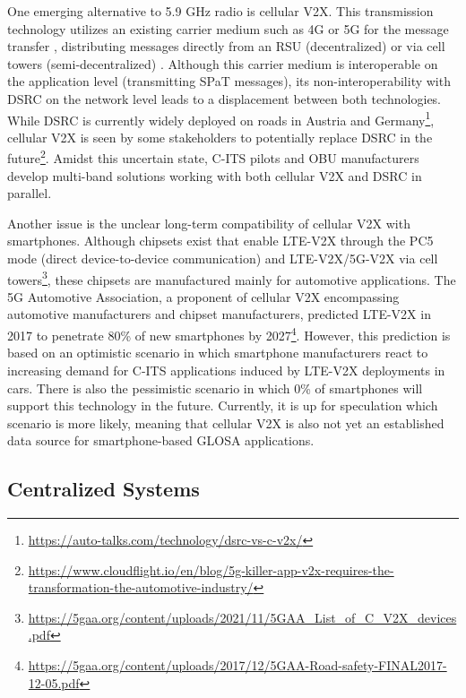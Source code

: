 One emerging alternative to 5.9 GHz radio is cellular V2X. This transmission technology utilizes an existing carrier medium such as 4G or 5G for the message transfer \cite{xia_field_2012, zweck_traffic_2013, bhattacharyya_assessing_2022}, distributing messages directly from an RSU (decentralized) \cite{bohm_radio_2017} or via cell towers (semi-decentralized) \cite{strobl_c-its_2019, jacob_ivs-kom_2020}. Although this carrier medium is interoperable on the application level (transmitting SPaT messages), its non-interoperability with DSRC \cite{bohm_radio_2017} on the network level leads to a displacement between both technologies. While DSRC is currently widely deployed on roads in Austria and Germany\footnote{\url{https://auto-talks.com/technology/dsrc-vs-c-v2x/}}, cellular V2X is seen by some stakeholders to potentially replace DSRC in the future\footnote{\label{cloudflight-article}\url{https://www.cloudflight.io/en/blog/5g-killer-app-v2x-requires-the-transformation-the-automotive-industry/}}. Amidst this uncertain state, C-ITS pilots \cite{strobl_c-its_2019} and OBU manufacturers \cite{jacob_ivs-kom_2020} develop multi-band solutions working with both cellular V2X and DSRC in parallel.

Another issue is the unclear long-term compatibility of cellular V2X with smartphones. Although chipsets exist that enable LTE-V2X through the PC5 mode (direct device-to-device communication) and LTE-V2X/5G-V2X via cell towers\footnote{\url{https://5gaa.org/content/uploads/2021/11/5GAA_List_of_C_V2X_devices.pdf}}, these chipsets are manufactured mainly for automotive applications. The 5G Automotive Association, a proponent of cellular V2X encompassing automotive manufacturers and chipset manufacturers, predicted LTE-V2X in 2017 to penetrate 80\% of new smartphones by 2027\footnote{\url{https://5gaa.org/content/uploads/2017/12/5GAA-Road-safety-FINAL2017-12-05.pdf}}. However, this prediction is based on an optimistic scenario in which smartphone manufacturers react to increasing demand for C-ITS applications induced by LTE-V2X deployments in cars. There is also the pessimistic scenario in which 0\% of smartphones will support this technology in the future. Currently, it is up for speculation which scenario is more likely, meaning that cellular V2X is also not yet an established data source for smartphone-based GLOSA applications.

\subsection{Centralized Systems}

